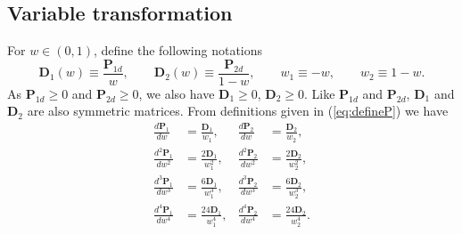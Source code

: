 \documentclass[12pt]{article}
\begin{document}
\subsection{Variable transformation}

For $w \in (0,1)$, define the following notations
\begin{equation}  \label{eq:var_simple}
\mathbf{D}_1 (w) \equiv \frac{\mathbf{P}_{1d}}{w}, \qquad \mathbf{D}_2 (w) \equiv \frac{\mathbf{P}_{2d}}{1-w}, \qquad w_1 \equiv -w, \qquad w_2 \equiv 1-w.
\end{equation}
As $\mathbf{P}_{1d} \geq 0$ and $\mathbf{P}_{2d} \geq 0$, we also have $\mathbf{D}_1 \geq 0$, $\mathbf{D}_2 \geq 0$. Like $\mathbf{P}_{1d}$ and $\mathbf{P}_{2d}$, $\mathbf{D}_1$ and $\mathbf{D}_2$ are also symmetric matrices. From definitions given in (\ref{eq:defineP}) we have
\begin{subequations}  \label{eq:P1+P2_difs}
\begin{align}
\frac{d \mathbf{P}_1}{dw} &= \frac{\mathbf{D}_1}{w_1}, & \frac{d \mathbf{P}_2}{dw} &= \frac{\mathbf{D}_2}{w_2},  \\ 
\frac{d^2 \mathbf{P}_1}{d w^2} &= \frac{2 \mathbf{D}_1}{w_1^2}, & \frac{d^2 \mathbf{P}_2}{d w^2} &= \frac{2 \mathbf{D}_2}{w_2^2},  \\
\frac{d^3 \mathbf{P}_1}{d w^3} &= \frac{6 \mathbf{D}_1}{w_1^3}, & \frac{d^3 \mathbf{P}_2}{d w^3} &= \frac{6 \mathbf{D}_2}{w_2^3},  \\
\frac{d^4 \mathbf{P}_1}{d w^4} &= \frac{24 \mathbf{D}_1}{w_1^4}, & \frac{d^4 \mathbf{P}_2}{d w^4} &= \frac{24 \mathbf{D}_2}{w_2^4}.
\end{align}
\end{subequations}
\end{document}
